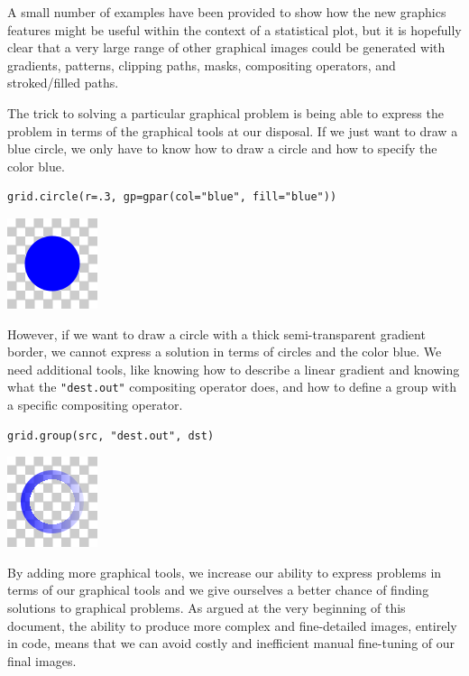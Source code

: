 A small number of
examples have been provided to show how the new graphics features
might be useful within the context of a statistical plot, but
it is hopefully clear that a very large
range of other graphical images could be generated with gradients,
patterns, clipping paths, masks, compositing operators,
and stroked/filled paths.

The trick to solving a particular graphical problem
is being able to express the problem in terms of the graphical
tools at our disposal.
If we just want to draw a blue circle,
we only have to know how to draw a circle
and how to specify the color blue.

\begin{verbatim}
grid.circle(r=.3, gp=gpar(col="blue", fill="blue"))
\end{verbatim}

\includegraphics{murrell-definitions-2023_files/figure-latex/unnamed-chunk-45-1.png}

However, if we want to draw a circle with a thick semi-transparent gradient
border, we cannot express a solution in terms of circles and the color
blue. We need additional tools, like knowing how to describe a
linear gradient and knowing what the \texttt{"dest.out"} compositing operator does,
and how to define a group with a specific compositing operator.

\begin{verbatim}
grid.group(src, "dest.out", dst)
\end{verbatim}

\includegraphics{murrell-definitions-2023_files/figure-latex/unnamed-chunk-47-1.png}

By adding more graphical tools, we increase our ability to express
problems in terms of our graphical tools and we
give ourselves a better chance of finding solutions to
graphical problems.
As argued at the very beginning of this document, the ability to produce more
complex and fine-detailed images, entirely in code, means that we can
avoid costly and inefficient manual
fine-tuning of our final images.

